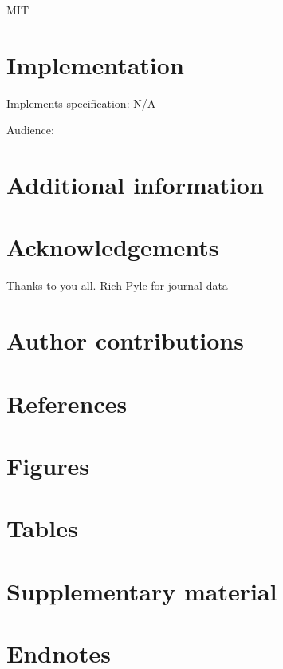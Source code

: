 \documentclass[
]{article}
\begin{document}
MIT

\hypertarget{implementation}{%
\section{Implementation}\label{implementation}}

Implements specification: N/A

Audience:

\hypertarget{additional-information}{%
\section{Additional information}\label{additional-information}}

\hypertarget{acknowledgements}{%
\section{Acknowledgements}\label{acknowledgements}}

Thanks to you all. Rich Pyle for journal data

\hypertarget{author-contributions}{%
\section{Author contributions}\label{author-contributions}}

\hypertarget{references}{%
\section{References}\label{references}}

\hypertarget{figures}{%
\section{Figures}\label{figures}}

\hypertarget{tables}{%
\section{Tables}\label{tables}}

\hypertarget{supplementary-material}{%
\section{Supplementary material}\label{supplementary-material}}

\hypertarget{endnotes}{%
\section{Endnotes}\label{endnotes}}
\end{document}
